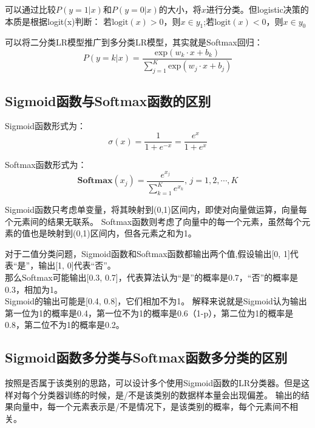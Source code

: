 可以通过比较$P(y=1|x)$和$P(y=0|x)$的大小，将$x$进行分类。但logistic决策的本质是根据logit(x)判断：
若$\text{logit}(x) > 0$，则$x\in y_1$;若$\text{logit}(x) < 0$，则$x\in y_0$

可以将二分类LR模型推广到多分类LR模型，其实就是Softmax回归：
\begin{equation*}
    P(y=k|x) = \frac{\text{exp}(w_k\cdot x + b_k)}{\sum_{j=1}^K \text{exp}(w_j \cdot x + b_j)}
\end{equation*}

\subsection{Sigmoid函数与Softmax函数的区别}
Sigmoid函数形式为：
\begin{equation*}
    \sigma(x) = \frac{1}{1 + e^{-x}} = \frac{e^{x}}{1 + e^{x}}
\end{equation*}

Softmax函数形式为：
\begin{equation*}
    \textbf{Softmax}(x_j) = \frac{e^{x_j}}{\sum_{k=1}^K e^{x_k}},\, j=1,2,\cdots,K
\end{equation*}

Sigmoid函数只考虑单变量，将其映射到(0,1)区间内，即使对向量做运算，向量每个元素间的结果无联系。
Softmax函数则考虑了向量中的每一个元素，虽然每个元素的值也是映射到(0,1)区间内，但各元素之和为1。

对于二值分类问题，Sigmoid函数和Softmax函数都输出两个值,假设输出[0, 1]代表“是”，输出[1, 0]代表“否”。\\
那么Softmax可能输出[0.3, 0.7]，代表算法认为“是”的概率是0.7，“否”的概率是0.3，相加为1。\\
Sigmoid的输出可能是[0.4, 0.8]，它们相加不为1。
解释来说就是Sigmoid认为输出第一位为1的概率是0.4，第一位不为1的概率是0.6（1-p），第二位为1的概率是0.8，第二位不为1的概率是0.2。

\subsection{Sigmoid函数多分类与Softmax函数多分类的区别}
按照是否属于该类别的思路，可以设计多个使用Sigmoid函数的LR分类器。但是这样对每个分类器训练的时候，是/不是该类别的数据样本量会出现偏差。
输出的结果向量中，每一个元素表示是/不是情况下，是该类别的概率，每个元素间不相关。

